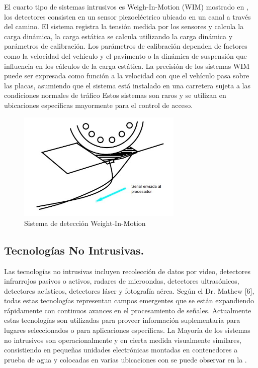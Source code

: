 El cuarto tipo de sistemas intrusivos es Weigh-In-Motion (WIM) mostrado en , los detectores consisten en un sensor piezoeléctrico ubicado en un canal a través del camino. El sistema registra la tensión medida por los sensores y calcula la carga dinámica, la carga estática se calcula utilizando la carga dinámica y parámetros de calibración. Los parámetros de calibración dependen de factores como la velocidad del vehículo y el pavimento o la dinámica de suspensión que influencia en los cálculos de la carga estática. La precisión de los sistemas WIM puede ser expresada como función a la velocidad con que el vehículo pasa sobre las placas, asumiendo que el sistema está instalado en una carretera sujeta a las condiciones normales de tráfico Estos sistemas son raros y se utilizan en ubicaciones específicas mayormente para el control de acceso.

\begin{figure}[h]
	\centering
	\includegraphics[width=0.7\textwidth]{capitulos/3/figuras/figura2.jpg}
	\caption{\label{fig:Weight-In-Motion}  Sistema de detección Weight-In-Motion}	
\end{figure}

\subsection{Tecnologías No Intrusivas.}

Las tecnologías no intrusivas incluyen recolección de datos por video, detectores infrarrojos pasivos o activos, radares de microondas, detectores ultrasónicos, detectores acústicos, detectores láser y fotografía aérea. Según el Dr. Mathew [6], todas estas tecnologías representan campos emergentes que se están expandiendo rápidamente con continuos avances en el procesamiento de señales. Actualmente estas tecnologías son utilizadas para proveer información suplementaria para lugares seleccionados o para aplicaciones específicas. La Mayoría de los sistemas no intrusivos son operacionalmente y en cierta medida visualmente similares, consistiendo en pequeñas unidades electrónicas montadas en contenedores a prueba de agua y colocadas en varias ubicaciones con se puede observar en la .

